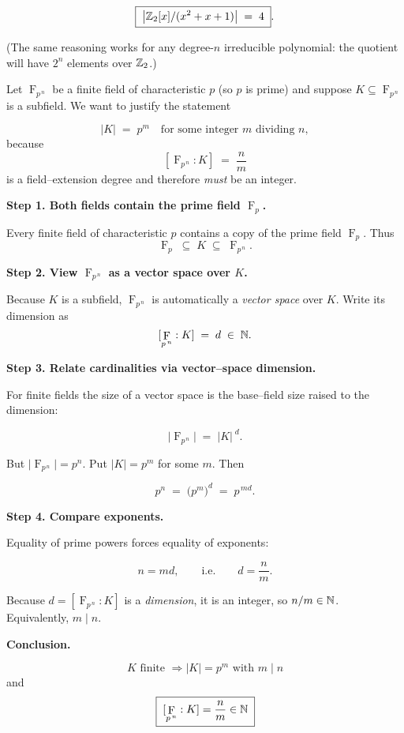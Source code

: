 \documentclass[12pt]{article}
\DeclareMathOperator{\F}{F}
\theoremstyle{definition} %
\theoremstyle{plain} %
\begin{document}
\[
\boxed{\; \bigl|\Bbb Z_{2}[x]/(x^{2}+x+1)\bigr| \;=\;4\; }.
\]

(The same reasoning works for any degree-\(n\) irreducible polynomial:
the quotient will have \(2^{n}\) elements over \(\Bbb Z_{2}\).)

Let \(\F_{p^{\,n}}\) be a finite field of characteristic \(p\) (so \(p\) is prime)  
and suppose \(K\subseteq\F_{p^{\,n}}\) is a subfield.  
We want to justify the statement

\[
\lvert K\rvert \;=\; p^{m}\quad\text{for some integer }m\text{ dividing }n,
\]
because
\[
[\F_{p^{\,n}}:K] \;=\; \frac{n}{m}
\]
is a field–extension degree and therefore \emph{must} be an integer.

\bigskip
\textbf{Step 1.  Both fields contain the prime field \(\F_{p}\).}

Every finite field of characteristic \(p\) contains a copy of the prime
field \(\F_{p}\).  Thus
\[
\F_{p}\;\subseteq\;K\;\subseteq\;\F_{p^{\,n}}.
\]

\bigskip
\textbf{Step 2.  View \(\F_{p^{\,n}}\) as a vector space over \(K\).}

Because \(K\) is a subfield, \(\F_{p^{\,n}}\) is automatically a
\emph{vector space} over \(K\).
Write its dimension as
\[
[\F_{p^{\,n}}:K] \;=\; d \;\in\;\Bbb N.
\]

\bigskip
\textbf{Step 3.  Relate cardinalities via vector–space dimension.}

For finite fields the size of a vector space is the base–field size
raised to the dimension:

\[
\lvert\F_{p^{\,n}}\rvert 
    \;=\;\lvert K\rvert^{\;d}.
\]

But \(\lvert\F_{p^{\,n}}\rvert = p^{n}\).  Put \(\lvert K\rvert=p^{m}\)
for some \(m\).  Then

\[
p^{n} \;=\; \bigl(p^{m}\bigr)^{d}
          \;=\; p^{\,md}.
\]

\bigskip
\textbf{Step 4.  Compare exponents.}

Equality of prime powers forces equality of exponents:

\[
n = m d,
\qquad\text{i.e.}\qquad
d = \frac{n}{m}.
\]

Because \(d=[\F_{p^{\,n}}:K]\) is a \emph{dimension}, it is an integer,
so \(n/m\in\Bbb N\).  
Equivalently, \(m\mid n\).

\bigskip
\textbf{Conclusion.}

\[
\boxed{\;
       K\text{ finite }\Longrightarrow\lvert K\rvert=p^{m}
       \text{ with }m\mid n
      \;}
\]
and
\[
\boxed{\;
       [\F_{p^{\,n}}:K] = \frac{n}{m}\in\Bbb N
      \;}
\]
\end{document}
